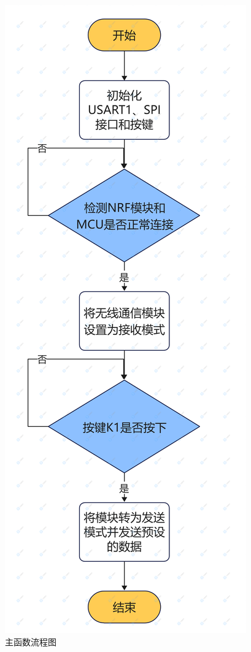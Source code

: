 \documentclass[UTF8,a4paper,11pt]{article}
\begin{document}
\begin{figure}[htbp]
    \centering
    \includegraphics[scale=0.13]{p17.png}
    \caption{主函数流程图}
\end{figure} 
\end{document}
